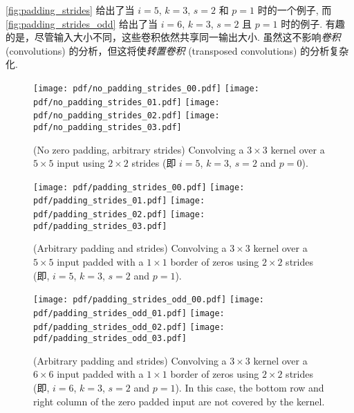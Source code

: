 \documentclass[notitlepage]{ctexrep}
\begin{document}
\autoref{fig:padding_strides} 给出了当 $i = 5$, $k = 3$, $s = 2$
和 $p = 1$ 时的一个例子, 而 \autoref{fig:padding_strides_odd} 给出了当 $i = 6$, $k = 3$, $s = 2$ 且 $p = 1$ 时的例子. 有趣的是，尽管输入大小不同，这些卷积依然共享同一输出大小. 虽然这不影响{\em 卷积}(convolutions) 的分析，但这将使{\em 转置卷积} (transposed convolutions) 的分析复杂化.

\begin{figure}[p]
    \centering
    \texttt{[image: pdf/no\_padding\_strides\_00.pdf]}
    \texttt{[image: pdf/no\_padding\_strides\_01.pdf]}
    \texttt{[image: pdf/no\_padding\_strides\_02.pdf]}
    \texttt{[image: pdf/no\_padding\_strides\_03.pdf]}
    \caption{\label{fig:no_padding_strides} (No zero padding, arbitrary
        strides) Convolving a $3 \times 3$ kernel over a $5 \times 5$ input
        using $2 \times 2$ strides (即 $i = 5$, $k = 3$, $s = 2$ and
        $p = 0$).}
\end{figure}

\begin{figure}[p]
    \centering
    \texttt{[image: pdf/padding\_strides\_00.pdf]}
    \texttt{[image: pdf/padding\_strides\_01.pdf]}
    \texttt{[image: pdf/padding\_strides\_02.pdf]}
    \texttt{[image: pdf/padding\_strides\_03.pdf]}
    \caption{\label{fig:padding_strides} (Arbitrary padding and strides)
        Convolving a $3 \times 3$ kernel over a $5 \times 5$ input padded with
        a $1 \times 1$ border of zeros using $2 \times 2$ strides (即,
        $i = 5$, $k = 3$, $s = 2$ and $p = 1$).}
\end{figure}

\begin{figure}[p]
    \centering
    \texttt{[image: pdf/padding\_strides\_odd\_00.pdf]}
    \texttt{[image: pdf/padding\_strides\_odd\_01.pdf]}
    \texttt{[image: pdf/padding\_strides\_odd\_02.pdf]}
    \texttt{[image: pdf/padding\_strides\_odd\_03.pdf]}
    \caption{\label{fig:padding_strides_odd} (Arbitrary padding and strides)
        Convolving a $3 \times 3$ kernel over a $6 \times 6$ input padded with
        a $1 \times 1$ border of zeros using $2 \times 2$ strides (即,
        $i = 6$, $k = 3$, $s = 2$ and $p = 1$). In this case, the bottom row
        and right column of the zero padded input are not covered by the
        kernel.}
\end{figure}
\end{document}
